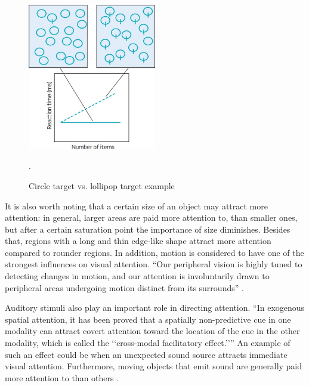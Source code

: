 \begin{figure}[h!]
	\centering
	\includegraphics[width=0.5\textwidth]{figures/circle_lollipop_example.jpg}
	\caption{Circle target vs. lollipop target example \cite{snowden2012basic}}.\label{fig:circle_lollipop_example}
\end{figure}

It is also worth noting that a certain size of an object may attract more attention: in general, larger areas are paid more attention to, than smaller ones, but after a certain saturation point the importance of size diminishes. Besides that, regions with a long and thin edge-like shape attract more attention compared to rounder regions. In addition, motion is considered to have one of the strongest influences on visual attention. “Our peripheral vision is highly tuned to detecting changes in motion, and our attention is involuntarily drawn to peripheral areas undergoing motion distinct from its surrounds” \cite{osberger1998automatic}. 


Auditory stimuli also play an important role in directing attention. “In exogenous spatial attention, it has been proved that a spatially non-predictive cue in one modality can attract covert attention toward the location of the cue in the other modality, which is called the ‘‘cross-modal facilitatory effect.’’” An example of such an effect could be when an unexpected sound source attracts immediate visual attention. Furthermore, moving objects that emit sound are generally paid more attention to than others \cite{lee2011efficient}.

